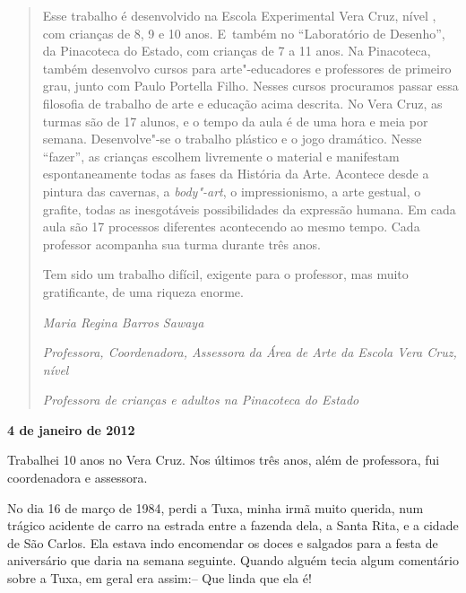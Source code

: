 \begin{quote}
Esse trabalho é desenvolvido na Escola Experimental Vera Cruz, nível ,
com crianças de 8, 9 e 10 anos. E~também no ``Laboratório de Desenho'',
da Pinacoteca do Estado, com crianças de 7 a 11 anos. Na Pinacoteca,
também desenvolvo cursos para arte"-educadores e professores de primeiro
grau, junto com Paulo Portella Filho. Nesses cursos procuramos passar
essa filosofia de trabalho de arte e educação acima descrita. No Vera
Cruz, as turmas são de 17 alunos, e o tempo da aula é de uma hora e meia
por semana. Desenvolve"-se o trabalho plástico e o jogo dramático. Nesse
``fazer'', as crianças escolhem livremente o material e manifestam
espontaneamente todas as fases da História da Arte. Acontece desde a
pintura das cavernas, a \emph{body"-art}, o impressionismo, a arte
gestual, o grafite, todas as inesgotáveis possibilidades da expressão
humana. Em cada aula são 17 processos diferentes acontecendo ao mesmo
tempo. Cada professor acompanha sua turma durante três anos.

Tem sido um trabalho difícil, exigente para o professor, mas muito
gratificante, de uma riqueza enorme.

\medskip{} 

\begin{flushright}\emph{Maria Regina Barros Sawaya}\end{flushright}

\begin{flushright}\emph{Professora, Coordenadora, Assessora da Área de Arte da Escola Vera
Cruz, nível }\end{flushright}

\begin{flushright}\emph{Professora de crianças e adultos na Pinacoteca do Estado}\end{flushright}


\end{quote}
\begin{center}\asterisc{}\end{center}

\begin{flushright}\textbf{4 de janeiro de 2012}\end{flushright}


Trabalhei 10 anos no Vera Cruz. Nos últimos três anos, além de
professora, fui coordenadora e assessora.

No dia 16 de março de 1984, perdi a Tuxa, minha irmã muito querida, num
trágico acidente de carro na estrada entre a fazenda dela, a Santa Rita,
e a cidade de São Carlos. Ela estava indo encomendar os doces e salgados
para a festa de aniversário que daria na semana seguinte. Quando alguém
tecia algum comentário sobre a Tuxa, em geral era assim:-- Que linda que
ela é!

